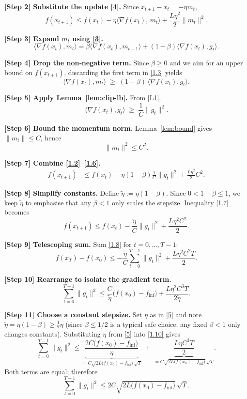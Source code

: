 \documentclass{article}
\begin{document}
\noindent\textbf{[Step 2] Substitute the update \eqref{4}.}  
Since $x_{t+1}-x_t=-\eta m_t$,
\[
f(x_{t+1})\le f(x_t)-\eta\langle\nabla f(x_t),\,m_t\rangle
+\frac{L\eta^{2}}{2}\|m_t\|^{2}.
\tag{1.2}
\]

\noindent\textbf{[Step 3] Expand $m_t$ using \eqref{3}.}  
\[
\langle\nabla f(x_t),m_t\rangle
= \beta\langle\nabla f(x_t),m_{t-1}\rangle
+ (1-\beta)\langle\nabla f(x_t),g_t\rangle .
\tag{1.3}
\]

\noindent\textbf{[Step 4] Drop the non‑negative term.}  
Since $\beta\ge0$ and we aim for an upper bound on $f(x_{t+1})$, discarding the first term in \eqref{1.3} yields
\[
\langle\nabla f(x_t),m_t\rangle
\;\ge\;(1-\beta)\,\langle\nabla f(x_t),g_t\rangle .
\tag{1.4}
\]

\noindent\textbf{[Step 5] Apply Lemma~\ref{lem:clip-lb}.}  
From \eqref{L1},
\[
\langle\nabla f(x_t),g_t\rangle \;\ge\; \frac{1}{C}\|g_t\|^{2}.
\tag{1.5}
\]

\noindent\textbf{[Step 6] Bound the momentum norm.}  
Lemma~\ref{lem:bound} gives $\|m_t\|\le C$, hence
\[
\|m_t\|^{2}\le C^{2}.
\tag{1.6}
\]

\noindent\textbf{[Step 7] Combine \eqref{1.2}–\eqref{1.6}.}  
\[
\begin{aligned}
f(x_{t+1})
&\le f(x_t)-\eta(1-\beta)\frac{1}{C}\|g_t\|^{2}
+\frac{L\eta^{2}}{2}C^{2}.
\end{aligned}
\tag{1.7}
\]

\noindent\textbf{[Step 8] Simplify constants.}  
Define $\tilde\eta:=\eta(1-\beta)$. Since $0<1-\beta\le1$, we keep $\tilde\eta$ to emphasise that any $\beta<1$ only scales the stepsize. Inequality \eqref{1.7} becomes
\[
f(x_{t+1})\le f(x_t)-\frac{\tilde\eta}{C}\|g_t\|^{2}
+\frac{L\eta^{2}C^{2}}{2}.
\tag{1.8}
\]

\noindent\textbf{[Step 9] Telescoping sum.}  
Sum \eqref{1.8} for $t=0,\dots,T-1$:
\[
f(x_T)-f(x_0)
\le -\frac{\tilde\eta}{C}\sum_{t=0}^{T-1}\|g_t\|^{2}
+ \frac{L\eta^{2}C^{2}T}{2}.
\tag{1.9}
\]

\noindent\textbf{[Step 10] Rearrange to isolate the gradient term.}
\[
\sum_{t=0}^{T-1}\|g_t\|^{2}
\le \frac{C}{\tilde\eta}\bigl(f(x_0)-f_{\inf}\bigr)
+ \frac{L\eta^{2}C^{3}T}{2\tilde\eta}.
\tag{1.10}
\]

\noindent\textbf{[Step 11] Choose a constant stepsize.}  
Set $\eta$ as in \eqref{5} and note $\tilde\eta=\eta(1-\beta)\ge \tfrac{1}{2}\eta$ (since $\beta\le 1/2$ is a typical safe choice; any fixed $\beta<1$ only changes constants). Substituting $\eta$ from \eqref{5} into \eqref{1.10} gives
\[
\sum_{t=0}^{T-1}\|g_t\|^{2}
\le
\underbrace{\frac{2C\bigl(f(x_0)-f_{\inf}\bigr)}{\eta}}_{\displaystyle = C\sqrt{2L\bigl(f(x_0)-f_{\inf}\bigr)}\,\sqrt{T}}
\;+\;
\underbrace{\frac{L\eta C^{3}T}{2}}_{\displaystyle = C\sqrt{2L\bigl(f(x_0)-f_{\inf}\bigr)}\,\sqrt{T}} .
\tag{1.11}
\]
Both terms are equal; therefore
\[
\sum_{t=0}^{T-1}\|g_t\|^{2}
\le 2 C\sqrt{2L\bigl(f(x_0)-f_{\inf}\bigr)}\,\sqrt{T}.
\tag{1.12}
\]
\end{document}
